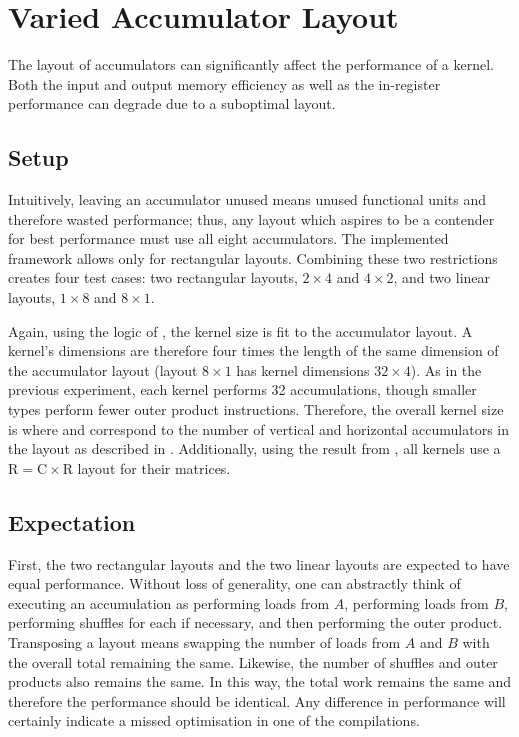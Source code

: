 \documentclass[\main/thesis.tex]{subfiles}
\begin{document}
\section{Varied Accumulator Layout}
The layout of accumulators can significantly affect the performance of a kernel.
Both the input and output memory efficiency as well as the in-register performance can degrade due to a suboptimal layout.

\subsection{Setup}
Intuitively, leaving an accumulator unused means unused functional units and therefore wasted performance; thus, any layout which aspires to be a contender for best performance must use all eight accumulators.
The implemented framework allows only for rectangular layouts.
Combining these two restrictions creates four test cases: two rectangular layouts, $2 \times 4$ and $4 \times 2$, and two linear layouts, $1 \times 8$ and $8 \times 1$.

Again, using the logic of , the kernel size is fit to the accumulator layout.
A kernel's dimensions are therefore four times the length of the same dimension of the accumulator layout (\eg layout $8 \times 1$ has kernel dimensions $32 \times 4$).
As in the previous experiment, each kernel performs 32 accumulations, though smaller types perform fewer outer product instructions.
Therefore, the overall kernel size is  where  and  correspond to the number of vertical and horizontal accumulators in the layout as described in .
Additionally, using the result from , all kernels use a $\textrm{R} = \textrm{C} \times \textrm{R}$ layout for their matrices.

\subsection{Expectation}
\label{sec:layoutExpectation}
First, the two rectangular layouts and the two linear layouts are expected to have equal performance.
Without loss of generality, one can abstractly think of executing an accumulation as performing loads from $A$, performing loads from $B$, performing shuffles for each if necessary, and then performing the outer product.
Transposing a layout means swapping the number of loads from $A$ and $B$ with the overall total remaining the same.
Likewise, the number of shuffles and outer products also remains the same.
In this way, the total work remains the same and therefore the performance should be identical.
Any difference in performance will certainly indicate a missed optimisation in one of the compilations.
\end{document}
